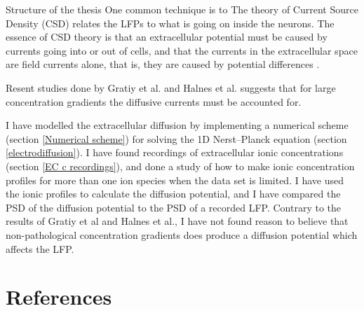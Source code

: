 \documentclass{article}
\begin{document}
{Structure of the thesis}
  One common technique is to 
The theory of Current Source Density (CSD) relates the LFPs to what is going on inside the neurons. The essence of CSD theory is that an extracellular potential must be caused by currents going into or out of cells, and that the currents in the extracellular space are field currents alone, that is, they are caused by potential differences \cite{Gratiy2017}. 

Resent studies done by Gratiy et al. and Halnes et al. suggests that for large concentration gradients the diffusive currents must be accounted for. 



 I have modelled the extracellular diffusion by implementing a numerical scheme (section \ref{Numerical scheme}) for solving the 1D  Nerst--Planck equation (section  \ref{electrodiffusion}). I have found recordings of extracellular ionic concentrations (section \ref{EC c recordings}), and done a study of how to make ionic concentration profiles for more than one ion species when the data set is limited. I have used the ionic profiles to calculate the diffusion potential, and I have compared the PSD of the diffusion potential to the PSD of a recorded LFP.  Contrary to the results of Gratiy et al and Halnes et al., I have not found reason to believe that non-pathological concentration gradients does produce a diffusion potential which affects the LFP. 

\section{References}
\end{document}
